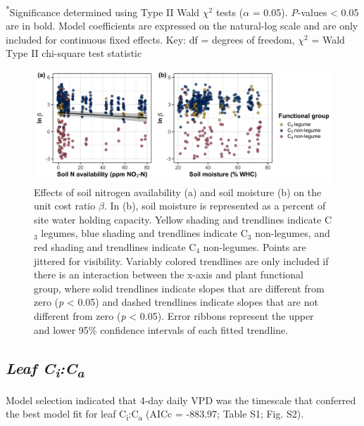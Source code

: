 \noindent \textsuperscript{*}Significance determined using Type II Wald $\chi^{2}$ tests ($\alpha$ = 0.05). \textit{P}-values < 0.05 are in bold. Model coefficients are expressed on the natural-log scale and are only included for continuous fixed effects. Key: df = degrees of freedom, $\chi^2$ = Wald Type II chi-square test statistic
\clearpage

\newpage
\begin{landscape}
    \begin{figure}
    \centering
    \includegraphics[scale = 0.075]{ch4_TXeco/figs/TXeco_fig2_beta.png}
    \caption[Effects of soil nitrogen availability and soil moisture on the unit cost ratio $\beta$]{Effects of soil nitrogen availability (a) and soil moisture (b) on the unit cost ratio $\beta$. In (b), soil moisture is represented as a percent of site water holding capacity. Yellow shading and trendlines indicate C$_3$ legumes, blue shading and trendlines indicate C$_3$ non-legumes, and red shading and trendlines indicate C$_4$ non-legumes. Points are jittered for visibility. Variably colored trendlines are only included if there is an interaction between the x-axis and plant functional group, where solid trendlines indicate slopes that are different from zero (\textit{p} < 0.05) and dashed trendlines indicate slopes that are not different from zero (\textit{p} < 0.05). Error ribbons represent the upper and lower 95\% confidence intervals of each fitted trendline.}
    \label{fig:figure4.2}
\end{figure}
\end{landscape}
\clearpage

\subsection{\textit{Leaf C\textsubscript{i}:C\textsubscript{a}}}
\noindent Model selection indicated that 4-day daily VPD was the timescale that conferred the best model fit for leaf C\textsubscript{i}:C\textsubscript{a} (AICc = -883.97; Table S1; Fig. S2).

